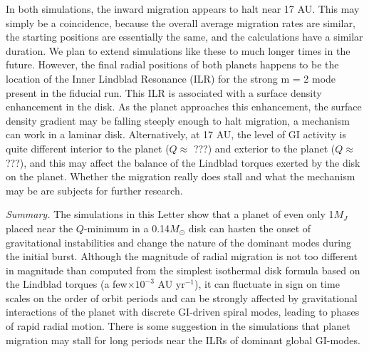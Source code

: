 \documentclass[12pt,manuscript,authoryear]{aastex}
\begin{document}
In both simulations, the inward migration appears to halt near 17 AU. This may simply be a coincidence, because the overall average migration rates are similar, the starting positions are essentially the same, and the calculations have a similar duration. We plan to extend simulations like these to much longer times in the future. However, the final radial positions of both planets happens to be the location of the Inner Lindblad Resonance (ILR) for the strong m = 2 mode present in the fiducial run. This ILR is associated with a surface density enhancement in the disk. 
As the planet approaches this enhancement, the surface density gradient may be falling steeply enough to halt migration, a mechanism can work in a laminar disk. 
Alternatively, at 17 AU, the level of GI activity is quite different interior to the planet ($Q \approx$ ???) and exterior to the planet ($Q \approx$ ???), and this may affect the balance of the Lindblad torques exerted by the disk on the planet. Whether the migration really does stall and what the mechanism may be are subjects for further research.

{\it Summary.} The simulations in this Letter show that a planet of even only 1$M_J$ placed near the $Q$-minimum in a 0.14$M_{\odot}$ disk can hasten the onset of gravitational instabilities and change the nature of the dominant modes during the initial burst. Although the magnitude of radial migration is not too different in magnitude than computed from the simplest isothermal disk formula based on the Lindblad torques (a few$\times10^{-3}$ AU yr$^{-1}$), it can fluctuate in sign on time scales on the order of orbit periods and can be strongly affected by gravitational interactions of the planet with discrete GI-driven spiral modes, leading to phases of rapid radial motion. There is some suggestion in the simulations that planet migration may stall for long periods near the ILRs of dominant global GI-modes. 
\end{document}
